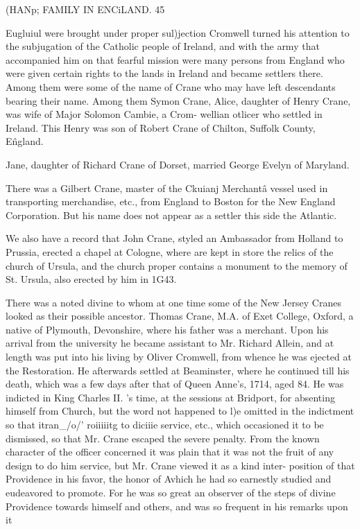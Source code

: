 (HANp; FAMILY IN ENCiLAND. 45 

Eugluiul were brought under proper sul)jection Cromwell turned 
his attention to the subjugation of the Catholic people of Ireland, 
and with the army that accompanied him on that fearful mission 
were many persons from England who were given certain rights 
to the lands in Ireland and became settlers there. Among them 
were some of the name of Crane who may have left descendants 
bearing their name. Among them Symon Crane, Alice, daughter 
of Henry Crane, was wife of Major Solomon Cambie, a Crom- 
wellian otlicer who settled in Ireland. This Henry was son of 
Robert Crane of Chilton, Suffolk County, E\^ngland. 

Jane, daughter of Richard Crane of Dorset, married George 
Evelyn of Maryland. 

There was a Gilbert Crane, master of the Ckuianj Merchant\^ 
a vessel used in transporting merchandise, etc., from England to 
Boston for the New England Corporation. But his name does 
not appear as a settler this side the Atlantic. 

We also have a record that John Crane, styled an Ambassador 
from Holland to Prussia, erected a chapel at Cologne, where are 
kept in store the relics of the church of Ursula, and the church 
proper contains a monument to the memory of St. Ursula, also 
erected by him in 1G43. 

There was a noted divine to whom at one time some of the 
New Jersey Cranes looked as their possible ancestor. Thomas 
Crane, M.A. of Exet College, Oxford, a native of Plymouth, 
Devonshire, where his father was a merchant. Upon his arrival 
from the university he became assistant to Mr. Richard Allein, 
and at length was put into his living by Oliver Cromwell, from 
whence he was ejected at the Restoration. He afterwards settled 
at Beaminster, where he continued till his death, which was a few 
days after that of Queen Anne's, 1714, aged 84. He was 
indicted in King Charles II. 's time, at the sessions at Bridport, 
for absenting himself from Church, but the word not happened to 
l)e omitted in the indictment so that itran\_/o/' roiiiiitg to diciiie 
service, etc., which occasioned it to be dismissed, so that Mr. 
Crane escaped the severe penalty. From the known character of 
the officer concerned it was plain that it was not the fruit of any 
design to do him service, but Mr. Crane viewed it as a kind inter- 
position of that Providence in his favor, the honor of Avhich he 
had so earnestly studied and eudeavored to promote. For he 
was so great an observer of the steps of divine Providence towards 
himself and others, and was so frequent in his remarks upon it 




